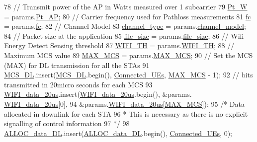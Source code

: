 \begin{DoxyCode}
78     \textcolor{comment}{// Transmit power of the AP in Watts measured over 1 subcarrier}
79     \hyperlink{classAP_a10998008dbe6e924211af8d9ee155534}{Pt\_W} = params.\hyperlink{structparameters_a4af7a6d10fd1012d16cba5f7b13c930b}{Pt\_AP};
80     \textcolor{comment}{// Carrier frequency used for Pathloss measurements}
81     \hyperlink{classAP_af7f928faaa72cbfe5c4f905cb146a564}{fc} = params.\hyperlink{structparameters_afcbb78167d255c8c249b6e868ae34cb8}{fc};
82     \textcolor{comment}{// Channel Model}
83     \hyperlink{classAP_a334f5b7be9725824797db57032de80e2}{channel\_type} = params.\hyperlink{structparameters_a16dba3ff81522c5acf14750929b461fc}{channel\_model};
84     \textcolor{comment}{// Packet size at the application }
85     \hyperlink{classAP_a6fe321d9d8cddb40d81e6c7152fae189}{file\_size} = params.\hyperlink{structparameters_a839992f2d6e75df2b71fa74147cd89fd}{file\_size};
86     \textcolor{comment}{// Wifi Energy Detect Sensing threshold}
87     \hyperlink{classAP_a42bd4510621509219054811e7350bf29}{WIFI\_TH} = params.\hyperlink{structparameters_a7f13646d17a6dd826f944a905a96cbd7}{WIFI\_TH};
88     \textcolor{comment}{// Maximum MCS value}
89     \hyperlink{classAP_a1fe0d98f0db9557f18e560f8bc96c2fc}{MAX\_MCS} = params.\hyperlink{structparameters_ab2821a9be5274d77b2f4f76ff06b2e65}{MAX\_MCS};
90     \textcolor{comment}{// Set the MCS (MAX) for DL transmission for all the STAs}
91     \hyperlink{classAP_a7b8604e8bed67e0abef14f54ba55ec19}{MCS\_DL}.insert(\hyperlink{classAP_a7b8604e8bed67e0abef14f54ba55ec19}{MCS\_DL}.begin(), \hyperlink{classAP_af0d927a781e8776c18758508a6845c85}{Connected\_UEs}, 
      \hyperlink{classAP_a1fe0d98f0db9557f18e560f8bc96c2fc}{MAX\_MCS} - 1);
92     \textcolor{comment}{// bits transmitted in 20micro seconds for each MCS}
93     \hyperlink{classAP_acbd517e31b830c7aebf62f9ea9635f93}{WIFI\_data\_20us}.insert(\hyperlink{classAP_acbd517e31b830c7aebf62f9ea9635f93}{WIFI\_data\_20us}.begin(), &params.
      \hyperlink{structparameters_a43e6f6e73d1ad0d57f816679cbbfd5a8}{WIFI\_data\_20us}[0],
94             &params.\hyperlink{structparameters_a43e6f6e73d1ad0d57f816679cbbfd5a8}{WIFI\_data\_20us}[\hyperlink{classAP_a1fe0d98f0db9557f18e560f8bc96c2fc}{MAX\_MCS}]);
95     \textcolor{comment}{/* Data allocated in downlink for each STA}
96 \textcolor{comment}{     * This is necessary as there is no explicit signalling of control information}
97 \textcolor{comment}{     */}
98     \hyperlink{classAP_a88e8d95cfbca5d598ec6cd900efa2b30}{ALLOC\_data\_DL}.insert(\hyperlink{classAP_a88e8d95cfbca5d598ec6cd900efa2b30}{ALLOC\_data\_DL}.begin(), 
      \hyperlink{classAP_af0d927a781e8776c18758508a6845c85}{Connected\_UEs}, 0);

\end{DoxyCode}
